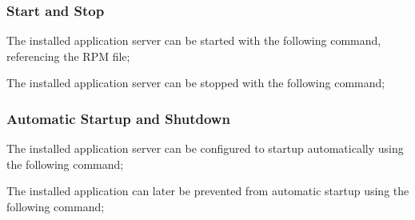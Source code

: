 \subsubsection{Start and Stop}

The installed application server can be started with the following command, referencing the RPM file;


The installed application server can be stopped with the following command;


\subsubsection{Automatic Startup and Shutdown}

The installed application server can be configured to startup automatically using the following command;


The installed application can later be prevented from automatic startup using the following command;


